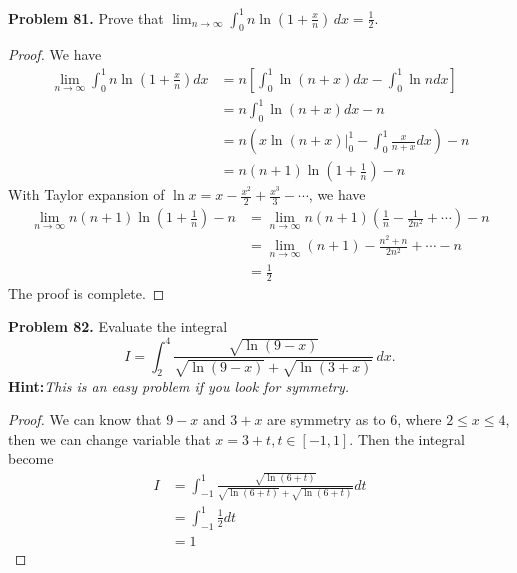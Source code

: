\documentclass[12pt,leqno]{amsart}
\begin{document}
\noindent
{\bf Problem 81.}
Prove that $\displaystyle\lim_{n\to\infty}\int_0^1n\ln\left(1+\frac{x}{n}\right)\, dx=\frac{1}{2}$.
\begin{proof}
We have 
\begin{align*}
    \lim_{n\to\infty}\int_0^1n\ln\left(1+\frac{x}{n}\right)dx & = n \left[\int^1_0\ln (n+x)dx - \int^1_0\ln ndx\right] \\
    & = n \int^1_0\ln (n+x)dx - n \\
    & = n \left(\left. x\ln (n+x)\right|^1_0 - \int^1_0 \frac{x}{n+x}dx\right) - n \\
    & = n(n+1)\ln \left(1+\frac{1}{n}\right) - n
\end{align*}
With Taylor expansion of $\ln x = x - \frac{x^2}{2} + \frac{x^3}{3} - \cdots$, we have 
\begin{align*}
    \lim_{n\to\infty}n(n+1)\ln \left(1+\frac{1}{n}\right) - n & = \lim_{n\to\infty} n(n+1)\left(\frac{1}{n} - \frac{1}{2n^2} + \cdots\right) - n \\
    & = \lim_{n\to\infty} (n+1) - \frac{n^2+n}{2n^2} + \cdots - n \\
    & = \frac{1}{2}
\end{align*}
The proof is complete.
\end{proof}

\noindent
{\bf Problem 82.}
Evaluate the integral
$$
I=\int_2^4\frac{\sqrt{\ln(9-x)}}{\sqrt{\ln(9-x)}+\sqrt{\ln(3+x)}}\, dx.
$$
{\bf Hint:}{\em This is an easy problem if you look for symmetry.}
\begin{proof}
We can know that $9-x$ and $3+x$ are symmetry as to $6$, where $2\leq x \leq 4$, then we can change variable that $x = 3 + t, t\in[-1,1]$. Then the integral become 
\begin{align*}
    I & = \int_{-1}^1\frac{\sqrt{\ln(6+t)}}{\sqrt{\ln(6+t)}+\sqrt{\ln(6+t)}} dt \\
    & = \int_{-1}^1 \frac{1}{2}dt \\
    & = 1
\end{align*}
\end{proof}

\medskip
\end{document}
